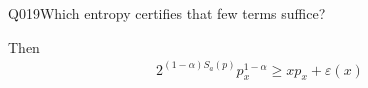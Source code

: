 \begin{entry}{Q019}{Which entropy certifies that few terms suffice?}
\begin{solution}
Then 
\begin{equation}
\begin{split}
    2^{(1-\alpha)S_a(p)}p_x^{1-\alpha} \geq xp_x + \varepsilon(x)
\end{split} 
\end{equation}


\end{solution}




\begin{takeaway}
\end{takeaway}


\end{entry}